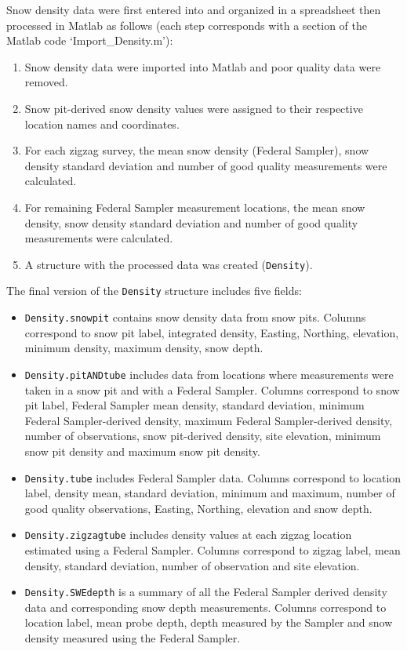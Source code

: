 \documentclass{sfuthesis}
\begin{document}
\begin{appendices}
Snow density data were first entered into and organized in a spreadsheet then processed in Matlab as follows (each step corresponds with a section of the Matlab code `Import\_Density.m'): 
\begin{enumerate}
\item Snow density data were imported into Matlab and poor quality data were removed. 
\item Snow pit-derived snow density values were assigned to their respective location names and coordinates.
\item For each zigzag survey, the mean snow density (Federal Sampler), snow density standard deviation and number of good quality measurements were calculated.
\item For remaining Federal Sampler measurement locations, the mean snow density, snow density standard deviation and number of good quality measurements were calculated. 
\item A structure with the processed data was created (\texttt{Density}).
\end{enumerate}

The final version of the \texttt{Density} structure includes five fields:
\begin{itemize}
\item[]\texttt{Density.snowpit} contains snow density data from snow pits. Columns correspond to snow pit label, integrated density, Easting, Northing, elevation, minimum density, maximum density, snow depth.
\item[]\texttt{Density.pitANDtube} includes data from locations where measurements were taken in a snow pit and with a Federal Sampler. Columns correspond to snow pit label, Federal  Sampler mean density, standard deviation, minimum Federal Sampler-derived density, maximum Federal Sampler-derived density, number of observations, snow pit-derived density, site elevation, minimum snow pit density and maximum snow pit density.
\item[]\texttt{Density.tube} includes Federal Sampler data. Columns correspond to location label, density mean, standard deviation, minimum and maximum, number of good quality observations, Easting, Northing, elevation and snow depth. 
\item[]\texttt{Density.zigzagtube} includes density values at each zigzag location estimated using a Federal Sampler. Columns correspond to zigzag label, mean density, standard deviation, number of observation and site elevation. 
\item[]\texttt{Density.SWEdepth} is a summary of all the Federal Sampler derived density data and corresponding snow depth measurements. Columns correspond to location label, mean probe depth, depth measured by the Sampler and snow density measured using the Federal Sampler. 
\end{itemize}


\end{appendices}
\end{document}

